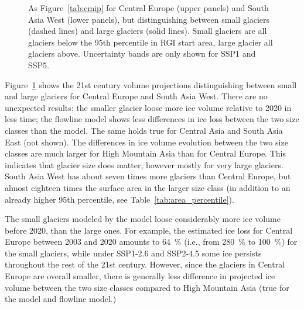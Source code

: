 \begin{figure}[htp]
          \vspace*{0.5cm}

          \caption{As Figure~\ref{tab:cmip} for Central Europe (upper panels) and South Asia West (lower panels), but distinguishing between small glaciers (dashed lines) and large glaciers (solid lines). Small glaciers are all glaciers below the 95th percentile in RGI start area, large glacier all glaciers above. Uncertainty bands are only shown for SSP1 and SSP5.}
          \label{fig:cmip_area_classes}
      \end{figure}

      Figure~\ref{fig:cmip_area_classes} shows the 21st century volume projections distinguishing between small and large glaciers for Central Europe and South Asia West. There are no unexpected results: the smaller glacier loose more ice volume relative to 2020 in less time; the flowline model shows less differences in ice loss between the two size classes than the \vas{} model. The same holds true for Central Asia and South Asia East (not shown). The differences in ice volume evolution between the two size classes are much larger for High Mountain Asia than for Central Europe. This indicates that glacier size does matter, however mostly for very large glaciers. South Asia West has about seven times more glaciers than Central Europe, but almost eighteen times the surface area in the larger size class (in addition to an already higher 95th percentile, see Table~\ref{tab:area_percentile}).

      The small glaciers modeled by the \vas{} model loose considerably more ice volume before 2020, than the large ones. For example, the estimated ice loss for Central Europe between 2003 and 2020 amounts to \SI{64}{\percent} (i.e., from \SI{280}{\percent} to \SI{100}{\percent}) for the small glaciers, while under SSP1-2.6 and SSP2-4.5 some ice persists throughout the rest of the 21st century. However, since the glaciers in Central Europe are overall smaller, there is generally less difference in projected ice volume between the two size classes compared to High Mountain Asia (true for the \vas{} model and flowline model.)

      \vspace*{1cm}

